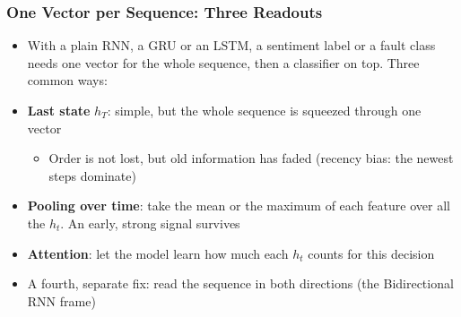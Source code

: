 \begin{frame}[fragile] \frametitle{One Vector per Sequence: Three Readouts}
\begin{itemize}
\item With a plain RNN, a GRU or an LSTM, a sentiment label or a fault class needs one vector for the whole sequence, then a classifier on top. Three common ways:
\item \textbf{Last state} $h_T$: simple, but the whole sequence is squeezed through one vector
  \begin{itemize}
  \item Order is not lost, but old information has faded (recency bias: the newest steps dominate)
  \end{itemize}
\item \textbf{Pooling over time}: take the mean or the maximum of each feature over all the $h_t$. An early, strong signal survives
\item \textbf{Attention}: let the model learn how much each $h_t$ counts for this decision
\item A fourth, separate fix: read the sequence in both directions (the Bidirectional RNN frame)
\end{itemize}
\begin{center}
\end{center}
\end{frame}
